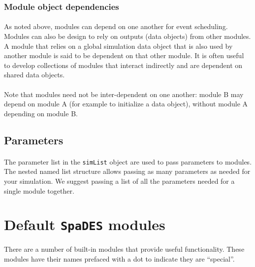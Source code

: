 \documentclass{article}
\begin{document}
\subsubsection{Module object dependencies}

\paragraph{} %
As noted above, modules can depend on one another for event scheduling. Modules can also be design to rely on outputs (data objects) from other modules. A module that relies on a global simulation data object that is also used by another module is said to be dependent on that other module. It is often useful to develop collections of modules that interact indirectly and are dependent on shared data objects.

\paragraph{}
Note that modules need not be inter-dependent on one another: module B may depend on module A (for example to initialize a data object), without module A depending on module B.

\subsection{Parameters}

\paragraph{}
The parameter list in the \texttt{simList} object are used to pass parameters to modules. The nested named list structure allows passing as many parameters as needed for your simulation. We suggest passing a list of all the parameters needed for a single module together.

\newpage

\section{Default \texttt{SpaDES} modules}

\paragraph{}
There are a number of built-in modules that provide useful functionality. These modules have their names prefaced with a dot to indicate they are ``special''.
\end{document}
